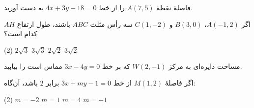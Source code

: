 
\vspace{0.6\baselineskip}

\begin{example}
    فاصلۀ نقطۀ \(A(7,5)\) را از خط
    \(4x+3y-18=0\) به دست آورید.
\end{example}


\vspace{0.8\baselineskip}

\begin{example}
    اگر \(A(-1,2)\)، \(B(3,0)\) و \(C(1,-2)\)
    سه رأس مثلث \(ABC\) باشند،
    طول ارتفاع \(AH\) کدام است؟

    \begin{tasks}(2)
        \task \(2\sqrt{3}\)
        \task \(3\sqrt{3}\)
        \task \(2\sqrt{2}\)
        \task \(3\sqrt{2}\)
    \end{tasks}
\end{example}


\vspace{0.8\baselineskip}

\begin{example}
    مساحت دایره‌ای به مرکز \(W(2,-1)\)
    که بر خط \(3x-4y=0\) مماس است را بیابید.
\end{example}


\vspace{0.8\baselineskip}

\begin{example}
    اگر فاصلۀ \(M(1,2)\) از خط
    \(3x+my-1=0\) برابر \(2\) باشد، آن‌گاه:

    \begin{tasks}(2)
        \task \(m=-2\)
        \task \(m=1\)
        \task \(m=4\)
        \task \(m=-1\)
    \end{tasks}
\end{example}



